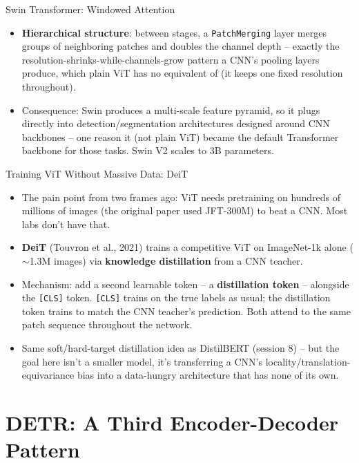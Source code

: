 \begin{vbframe}{Swin Transformer: Windowed Attention}
\begin{itemize}
  \item \textbf{Hierarchical structure}: between stages, a \texttt{PatchMerging} layer merges groups of neighboring patches and doubles the channel depth -- exactly the resolution-shrinks-while-channels-grow pattern a CNN's pooling layers produce, which plain ViT has no equivalent of (it keeps one fixed resolution throughout).
  \item Consequence: Swin produces a multi-scale feature pyramid, so it plugs directly into detection/segmentation architectures designed around CNN backbones -- one reason it (not plain ViT) became the default Transformer backbone for those tasks. Swin V2 scales to 3B parameters.
\end{itemize}
\end{vbframe}

\begin{vbframe}{Training ViT Without Massive Data: DeiT}
\begin{itemize}
  \item The pain point from two frames ago: ViT needs pretraining on hundreds of millions of images (the original paper used JFT-300M) to beat a CNN. Most labs don't have that.
  \item \textbf{DeiT} (Touvron et al., 2021) trains a competitive ViT on ImageNet-1k alone ($\sim$1.3M images) via \textbf{knowledge distillation} from a CNN teacher.
  \item Mechanism: add a second learnable token -- a \textbf{distillation token} -- alongside the {\tt [CLS]} token. {\tt [CLS]} trains on the true labels as usual; the distillation token trains to match the CNN teacher's prediction. Both attend to the same patch sequence throughout the network.
  \item Same soft/hard-target distillation idea as DistilBERT (session 8) -- but the goal here isn't a smaller model, it's transferring a CNN's locality/translation-equivariance bias into a data-hungry architecture that has none of its own.
\end{itemize}
\end{vbframe}


\section{DETR: A Third Encoder-Decoder Pattern}

